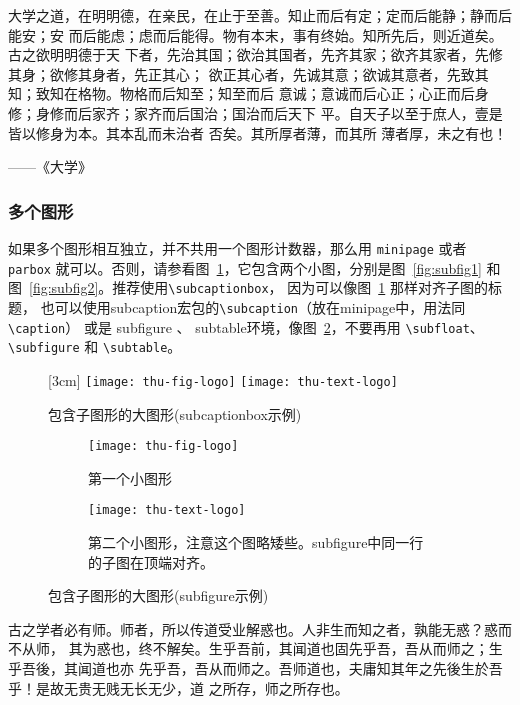 大学之道，在明明德，在亲民，在止于至善。知止而后有定；定而后能静；静而后能安；安
而后能虑；虑而后能得。物有本末，事有终始。知所先后，则近道矣。古之欲明明德于天
下者，先治其国；欲治其国者，先齐其家；欲齐其家者，先修其身；欲修其身者，先正其心；
欲正其心者，先诚其意；欲诚其意者，先致其知；致知在格物。物格而后知至；知至而后
意诚；意诚而后心正；心正而后身 修；身修而后家齐；家齐而后国治；国治而后天下
平。自天子以至于庶人，壹是皆以修身为本。其本乱而未治者 否矣。其所厚者薄，而其所
薄者厚，未之有也！

\hfill ——《大学》


\subsubsection{多个图形}
\label{sec:multifig}

如果多个图形相互独立，并不共用一个图形计数器，那么用 \verb|minipage| 或者
\verb|parbox| 就可以。否则，请参看图~\ref{fig:big1-subcaptionbox}，它包含两个小图，分别是图~\ref{fig:subfig1} 
和图~\ref{fig:subfig2}。推荐使用\verb|\subcaptionbox|，
因为可以像图~\ref{fig:big1-subcaptionbox} 那样对齐子图的标题，
也可以使用\textsf{subcaption}宏包的\verb|\subcaption|（放在minipage中，用法同\verb|\caption|）
或是 subfigure 、 subtable环境，像图~\ref{fig:big1-subfigure}，不要再用 \verb|\subfloat|、
\verb|\subfigure| 和 \verb|\subtable|。
\begin{figure}[h]
  \centering%
  [3cm] %
    {\texttt{[image: thu-fig-logo]}}
      \hspace{4em}%
      {\texttt{[image: thu-text-logo]}}
  \caption{包含子图形的大图形(subcaptionbox示例)}
  \label{fig:big1-subcaptionbox}
\end{figure}
\begin{figure}[h]
  \centering%
  \begin{subfigure}{3cm}
    \texttt{[image: thu-fig-logo]}
    \caption{第一个小图形}
  \end{subfigure}
  \hspace{4em}%
  \begin{subfigure}{0.5\textwidth}
    \texttt{[image: thu-text-logo]}
    \caption{第二个小图形，注意这个图略矮些。subfigure中同一行的子图在顶端对齐。}
  \end{subfigure}
  \caption{包含子图形的大图形(subfigure示例)}
  \label{fig:big1-subfigure}
\end{figure}
古之学者必有师。师者，所以传道受业解惑也。人非生而知之者，孰能无惑？惑而不从师，
其为惑也，终不解矣。生乎吾前，其闻道也固先乎吾，吾从而师之；生乎吾後，其闻道也亦
先乎吾，吾从而师之。吾师道也，夫庸知其年之先後生於吾乎！是故无贵无贱无长无少，道
之所存，师之所存也。


